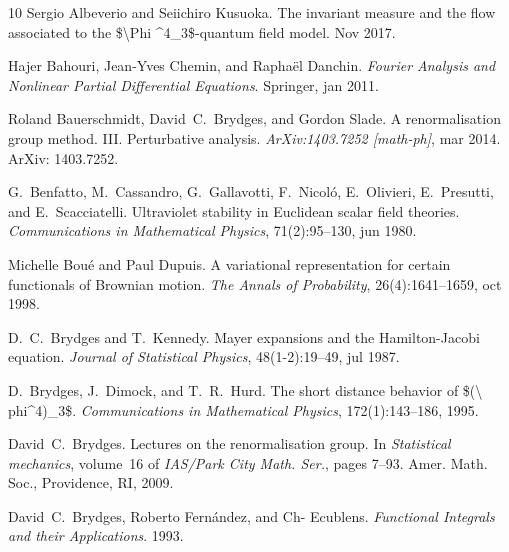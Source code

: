 \documentclass[11pt, oneside]{article}   	%
\newcommand{\tmtextit}[1]{{\itshape{#1}}}
\begin{document}
\begin{thebibliography}{10}
  Sergio Albeverio  and  Seiichiro
  Kusuoka. {\newblock}The invariant measure and the flow associated to the
  \$\textbackslash Phi {\textasciicircum}4\_3\$-quantum field model.
  {\newblock}Nov 2017.{\newblock}
  
  Hajer Bahouri, Jean-Yves Chemin, and 
  Rapha{\"e}l Danchin. {\newblock}\tmtextit{Fourier Analysis and Nonlinear
  Partial Differential Equations}. {\newblock}Springer, jan 2011.{\newblock}
  
  Roland Bauerschmidt,
  David~C.~Brydges, and  Gordon Slade. {\newblock}A renormalisation group
  method. III. Perturbative analysis. {\newblock}\tmtextit{ArXiv:1403.7252
  [math-ph]}, mar 2014. {\newblock}ArXiv: 1403.7252.{\newblock}
  
  G.~Benfatto, M.~Cassandro,
  G.~Gallavotti, F.~Nicol{\'o}, E.~Olivieri, E.~Presutti, and 
  E.~Scacciatelli. {\newblock}Ultraviolet stability in Euclidean scalar field
  theories. {\newblock}\tmtextit{Communications in Mathematical Physics},
  71(2):95--130, jun 1980.{\newblock}
  
  Michelle Bou{\'e}  and  Paul Dupuis.
  {\newblock}A variational representation for certain functionals of Brownian
  motion. {\newblock}\tmtextit{The Annals of Probability}, 26(4):1641--1659,
  oct 1998.{\newblock}
  
  D.~C.~Brydges  and  T.~Kennedy.
  {\newblock}Mayer expansions and the Hamilton-Jacobi equation.
  {\newblock}\tmtextit{Journal of Statistical Physics}, 48(1-2):19--49, jul
  1987.{\newblock}
  
  D.~Brydges, J.~Dimock, and  T.~R.~Hurd.
  {\newblock}The short distance behavior of \$(\textbackslash
  phi{\textasciicircum}4)\_3\$. {\newblock}\tmtextit{Communications in
  Mathematical Physics}, 172(1):143--186, 1995.{\newblock}
  
  David~C.~Brydges. {\newblock}Lectures on
  the renormalisation group. {\newblock}In \tmtextit{Statistical mechanics}, 
  volume~16  of \tmtextit{IAS/Park City Math. Ser.},  pages  7--93. Amer.
  Math. Soc., Providence, RI, 2009.{\newblock}
  
  David~C.~Brydges, Roberto Fern{\'a}ndez,
  and  Ch- Ecublens. {\newblock}\tmtextit{Functional Integrals and their
  Applications}. {\newblock}1993.{\newblock}
  

\end{thebibliography}
\end{document}
